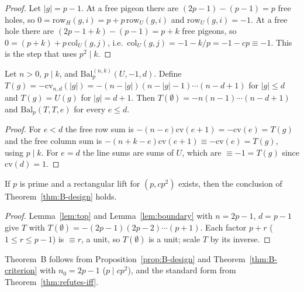 \begin{proof}
Let $|g|=p-1$.  At a free pigeon there are $(2p-1)-(p-1)=p$ free holes, so
$0=\mathrm{row}_H(g,i)=p+p\,\mathrm{row}_U(g,i)$ and $\mathrm{row}_U(g,i)=-1$.  At a
free hole there are $(2p-1+k)-(p-1)=p+k$ free pigeons, so
$0=(p+k)+p\,\mathrm{col}_U(g,j)$, i.e.\ $\mathrm{col}_U(g,j)=-1-k/p=-1-cp\equiv-1$.
This is the step that uses $p^2\mid k$.
\end{proof}

\begin{lemma}\label{lem:boundary}
Let $n>0$, $p\mid k$, and $\mathrm{Bal}^{(n,k)}_p(U,-1,d)$.  Define
$T(g)=-\mathrm{cv}_{n,d}(|g|)=-(n-|g|)(n-|g|-1)\cdots(n-d+1)$ for $|g|\le d$ and
$T(g)=U(g)$ for $|g|=d+1$.  Then $T(\emptyset)=-n(n-1)\cdots(n-d+1)$ and
$\mathrm{Bal}_p(T,T,e)$ for every $e\le d$.
\end{lemma}

\begin{proof}
For $e<d$ the free row sum is $-(n-e)\mathrm{cv}(e+1)=-\mathrm{cv}(e)=T(g)$ and the
free column sum is $-(n+k-e)\mathrm{cv}(e+1)\equiv-\mathrm{cv}(e)=T(g)$, using $p\mid k$.  For
$e=d$ the line sums are sums of $U$, which are $\equiv-1=T(g)$ since
$\mathrm{cv}(d)=1$.
\end{proof}

\begin{proposition}\label{prop:B-design}
If $p$ is prime and a rectangular lift for $(p,cp^2)$ exists, then the conclusion
of Theorem~\ref{thm:B-design} holds.
\end{proposition}

\begin{proof}
Lemma~\ref{lem:top} and Lemma~\ref{lem:boundary} with $n=2p-1$, $d=p-1$ give $T$ with
$T(\emptyset)=-(2p-1)(2p-2)\cdots(p+1)$.  Each factor $p+r$ ($1\le r\le p-1$) is
$\equiv r$, a unit, so $T(\emptyset)$ is a unit;
scale $T$ by its inverse.
\end{proof}

Theorem~B follows from Proposition~\ref{prop:B-design} and
Theorem~\ref{thm:B-criterion} with $n_0=2p-1$ ($p\mid cp^2$), and the standard form
from Theorem~\ref{thm:refutes-iff}.

